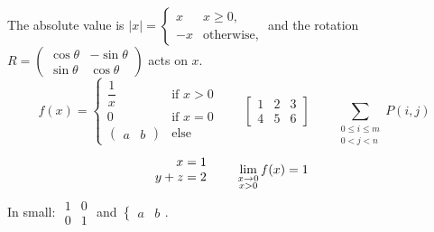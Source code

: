 \documentclass[11pt]{article}
\begin{document}
The absolute value is $|x| = \begin{cases} x & x \ge 0,\\ -x & \text{otherwise}, \end{cases}$ and the rotation
$R = \left(\begin{smallmatrix} \cos\theta & -\sin\theta \\ \sin\theta & \cos\theta \end{smallmatrix}\right)$ acts on $x$.
\[ f(x) = \begin{cases} \dfrac{1}{x} & \text{if } x > 0 \\ 0 & \text{if } x = 0 \\ \begin{pmatrix} a & b \end{pmatrix} & \text{else} \end{cases}
   \qquad \left[\begin{array}{cc|c} 1 & 2 & 3 \\ 4 & 5 & 6 \end{array}\right] \qquad \sum_{\substack{0 \le i \le m \\ 0 < j < n}} P(i,j) \]
\begin{align}
  \begin{array}{r@{\;=\;}l} x & 1 \\ y + z & 2 \end{array} &\quad & \lim_{\substack{x\to 0\\ x>0}} f(x) &= 1
\end{align}
{\small In small: $\begin{smallmatrix} 1 & 0 \\ 0 & 1 \end{smallmatrix}$ and $\begin{cases} a & b \end{cases}$.}
\end{document}
